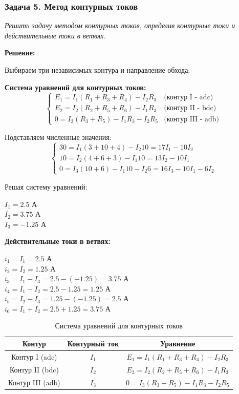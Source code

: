\subsubsection{Задача 5. Метод контурных токов}
\textit{Решить задачу методом контурных токов, определив контурные токи и действительные токи в ветвях.}

\textbf{Решение:}

Выбираем три независимых контура и направление обхода:

\textbf{Система уравнений для контурных токов:}
$$\begin{cases}
E_1 = I_1 (R_1 + R_3 + R_4) - I_2R_3 & \text{(контур I - adc)} \\
E_2 = I_2 (R_2 + R_5 + R_6) - I_1R_3 & \text{(контур II - bdc)} \\
0 = I_3 (R_3 + R_5) - I_1R_3 - I_2R_5 & \text{(контур III - adb)}
\end{cases}$$

Подставляем численные значения:
$$\begin{cases}
30 = I_1 (3 + 10 + 4) - I_2 10 = 17I_1 - 10I_2 \\
10 = I_2 (4 + 6 + 3) - I_1 10 = 13I_2 - 10I_1 \\
0 = I_3 (10 + 6) - I_1 10 - I_2 6 = 16I_3 - 10I_1 - 6I_2
\end{cases}$$

Решая систему уравнений:
\begin{flushleft}
$I_1 = 2.5$ А \\
$I_2 = 3.75$ А \\
$I_3 = -1.25$ А
\end{flushleft}

\textbf{Действительные токи в ветвях:}
\begin{flushleft}
$i_1 = I_1 = 2.5$ А \\
$i_2 = I_2 = 1.25$ А \\
$i_3 = I_1 - I_3 = 2.5 - (-1.25) = 3.75$ А \\
$i_4 = I_1 - I_2 = 2.5 - 1.25 = 1.25$ А \\
$i_5 = I_2 - I_3 = 1.25 - (-1.25) = 2.5$ А \\
$i_6 = I_1 + I_2 = 2.5 + 1.25 = 3.75$ А
\end{flushleft}

\begin{table}[H]
\centering
\begin{tabular}{|c|c|c|}
\hline
\textbf{Контур} & \textbf{Контурный ток} & \textbf{Уравнение} \\
\hline
Контур I (adc) & $I_1$ & $E_1 = I_1  (R_1+R_3+R_4) - I_2R_3$ \\
\hline
Контур II (bdc) & $I_2$ & $E_2 = I_2  (R_2+R_5+R_6) - I_1R_3$ \\
\hline
Контур III (adb) & $I_3$ & $0 = I_3  (R_3+R_5) - I_1R_3 - I_2R_5$ \\
\hline
\end{tabular}
\caption{Система уравнений для контурных токов}
\label{tab:loop_current_equations}
\end{table}

